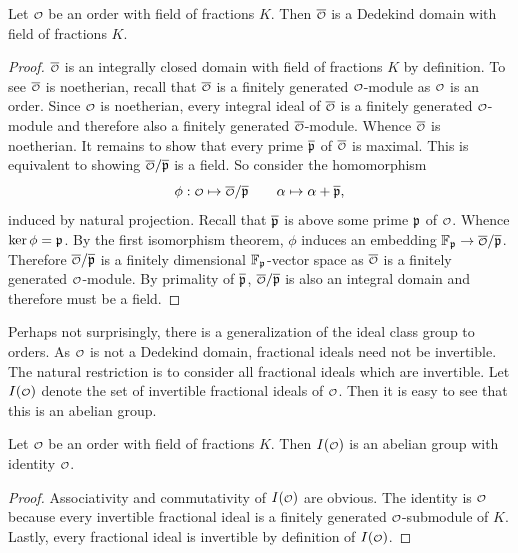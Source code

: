     \begin{proposition}\label{prop:normalization_of_order_is_Dedekind}
      Let \(\smc{O}\) be an order with field of fractions \(K\). Then \(\conj{\smc{O}}\) is a Dedekind domain with field of fractions \(K\).
    \end{proposition}
    \begin{proof}
      \(\conj{\smc{O}}\) is an integrally closed domain with field of fractions \(K\) by definition. To see \(\conj{\smc{O}}\) is noetherian, recall that \(\conj{\smc{O}}\) is a finitely generated \(\smc{O}\)-module as \(\smc{O}\) is an order. Since \(\smc{O}\) is noetherian, every integral ideal of \(\conj{\smc{O}}\) is a finitely generated \(\smc{O}\)-module and therefore also a finitely generated \(\conj{\smc{O}}\)-module. Whence \(\conj{\smc{O}}\) is noetherian. It remains to show that every prime \(\overline{\mathfrak{p}}\) of \(\conj{\smc{O}}\) is maximal. This is equivalent to showing \(\conj{\smc{O}}/\conj{\mf{p}}\) is a field. So consider the homomorphism
      \[
        \phi:\smc{O} \mapsto \conj{\smc{O}}/\conj{\mf{p}} \qquad \a \mapsto \a+\conj{\mf{p}},
      \]
      induced by natural projection. Recall that \(\overline{\mathfrak{p}}\) is above some prime \(\mathfrak{p}\) of \(\smc{O}\). Whence \(\ker\phi = \mathfrak{p}\). By the first isomorphism theorem, \(\phi\) induces an embedding \(\F_{\mf{p}} \to \conj{\smc{O}}/\conj{\mf{p}}\). Therefore \(\conj{\smc{O}}/\conj{\mf{p}}\) is a finitely dimensional \(\mathbb{F}_{\mathfrak{p}}\)-vector space as \(\conj{\smc{O}}\) is a finitely generated \(\smc{O}\)-module. By primality of \(\overline{\mathfrak{p}}\), \(\conj{\smc{O}}/\conj{\mf{p}}\) is also an integral domain and therefore must be a field.
    \end{proof}

    Perhaps not surprisingly, there is a generalization of the ideal class group to orders. As \(\smc{O}\) is not a Dedekind domain, fractional ideals need not be invertible. The natural restriction is to consider all fractional ideals which are invertible. Let \(I(\smc{O})\) denote the set of invertible fractional ideals of \(\smc{O}\). Then it is easy to see that this is an abelian group.

    \begin{theorem}\label{thm:order_ideal_group_is_a_group}
      Let \(\smc{O}\) be an order with field of fractions \(K\). Then \(I(\smc{O})\) is an abelian group with identity \(\smc{O}\).
    \end{theorem}
    \begin{proof}
      Associativity and commutativity of \(I(\smc{O})\) are obvious. The identity is \(\smc{O}\) because every invertible fractional ideal is a finitely generated \(\smc{O}\)-submodule of \(K\). Lastly, every fractional ideal is invertible by definition of \(I(\smc{O})\).
    \end{proof}
    
